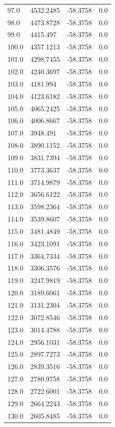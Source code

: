 \begin{table}[H]
\begin{tabular}{llll}
97.0 & 4532.2485 & -58.3758 & 0.0 \\
98.0 & 4473.8728 & -58.3758 & 0.0 \\
99.0 & 4415.497 & -58.3758 & 0.0 \\
100.0 & 4357.1213 & -58.3758 & 0.0 \\
101.0 & 4298.7455 & -58.3758 & 0.0 \\
102.0 & 4240.3697 & -58.3758 & 0.0 \\
103.0 & 4181.994 & -58.3758 & 0.0 \\
104.0 & 4123.6182 & -58.3758 & 0.0 \\
105.0 & 4065.2425 & -58.3758 & 0.0 \\
106.0 & 4006.8667 & -58.3758 & 0.0 \\
107.0 & 3948.491 & -58.3758 & 0.0 \\
108.0 & 3890.1152 & -58.3758 & 0.0 \\
109.0 & 3831.7394 & -58.3758 & 0.0 \\
110.0 & 3773.3637 & -58.3758 & 0.0 \\
111.0 & 3714.9879 & -58.3758 & 0.0 \\
112.0 & 3656.6122 & -58.3758 & 0.0 \\
113.0 & 3598.2364 & -58.3758 & 0.0 \\
114.0 & 3539.8607 & -58.3758 & 0.0 \\
115.0 & 3481.4849 & -58.3758 & 0.0 \\
116.0 & 3423.1091 & -58.3758 & 0.0 \\
117.0 & 3364.7334 & -58.3758 & 0.0 \\
118.0 & 3306.3576 & -58.3758 & 0.0 \\
119.0 & 3247.9819 & -58.3758 & 0.0 \\
120.0 & 3189.6061 & -58.3758 & 0.0 \\
121.0 & 3131.2304 & -58.3758 & 0.0 \\
122.0 & 3072.8546 & -58.3758 & 0.0 \\
123.0 & 3014.4788 & -58.3758 & 0.0 \\
124.0 & 2956.1031 & -58.3758 & 0.0 \\
125.0 & 2897.7273 & -58.3758 & 0.0 \\
126.0 & 2839.3516 & -58.3758 & 0.0 \\
127.0 & 2780.9758 & -58.3758 & 0.0 \\
128.0 & 2722.6001 & -58.3758 & 0.0 \\
129.0 & 2664.2243 & -58.3758 & 0.0 \\
130.0 & 2605.8485 & -58.3758 & 0.0 \\

\end{tabular}
\end{table}
